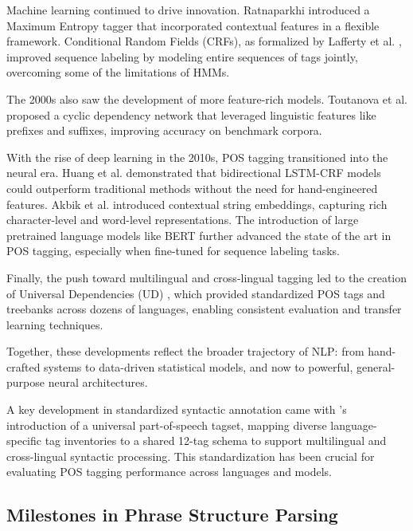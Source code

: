Machine learning continued to drive innovation. Ratnaparkhi \cite{ratnaparkhi1996maximum} introduced a Maximum Entropy tagger that incorporated contextual features in a flexible framework. Conditional Random Fields (CRFs), as formalized by Lafferty et al. \cite{lafferty2001conditional}, improved sequence labeling by modeling entire sequences of tags jointly, overcoming some of the limitations of HMMs.

The 2000s also saw the development of more feature-rich models. Toutanova et al. \cite{toutanova2003feature} proposed a cyclic dependency network that leveraged linguistic features like prefixes and suffixes, improving accuracy on benchmark corpora.

With the rise of deep learning in the 2010s, POS tagging transitioned into the neural era. Huang et al. \cite{huang2015bidirectional} demonstrated that bidirectional LSTM-CRF models could outperform traditional methods without the need for hand-engineered features. Akbik et al. \cite{akbik2018contextual} introduced contextual string embeddings, capturing rich character-level and word-level representations. The introduction of large pretrained language models like BERT \cite{devlin2019bert} further advanced the state of the art in POS tagging, especially when fine-tuned for sequence labeling tasks.

Finally, the push toward multilingual and cross-lingual tagging led to the creation of Universal Dependencies (UD) \cite{nivre2016universal}, which provided standardized POS tags and treebanks across dozens of languages, enabling consistent evaluation and transfer learning techniques.

Together, these developments reflect the broader trajectory of NLP: from hand-crafted systems to data-driven statistical models, and now to powerful, general-purpose neural architectures.


A key development in standardized syntactic annotation came with \citet{petrov2012universal}'s introduction of a universal part-of-speech tagset, mapping diverse language-specific tag inventories to a shared 12-tag schema to support multilingual and cross-lingual syntactic processing. This standardization has been crucial for evaluating POS tagging performance across languages and models.

\subsection{Milestones in Phrase Structure Parsing}

